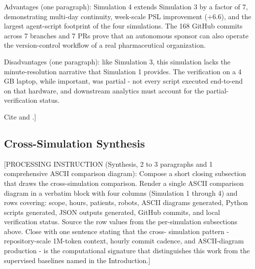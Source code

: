 Advantages (one paragraph): Simulation 4 extends Simulation 3 by a
factor of 7, demonstrating multi-day continuity, week-scale PSL
improvement (+6.6), and the largest agent-script footprint of the four
simulations. The 168 GitHub commits across 7 branches and 7 PRs prove
that an autonomous sponsor can also operate the version-control workflow
of a real pharmaceutical organization.

Disadvantages (one paragraph): like Simulation 3, this simulation lacks
the minute-resolution narrative that Simulation 1 provides. The
verification on a 4 GB laptop, while important, was partial - not every
script executed end-to-end on that hardware, and downstream analytics
must account for the partial-verification status.

Cite \cite{kawchak_2026_19396256} and \cite{fda2026realtime}.]

\subsection{Cross-Simulation Synthesis}
\label{sec:results-synthesis}

[PROCESSING INSTRUCTION (Synthesis, 2 to 3 paragraphs and 1 comprehensive
ASCII comparison diagram): Compose a short closing subsection that draws
the cross-simulation comparison. Render a single ASCII comparison diagram
in a verbatim block with four columns (Simulation 1 through 4) and rows
covering: scope, hours, patients, robots, ASCII diagrams generated,
Python scripts generated, JSON outputs generated, GitHub commits, and
local verification status. Source the row values from the per-simulation
subsections above. Close with one sentence stating that the cross-
simulation pattern - repository-scale 1M-token context, hourly commit
cadence, and ASCII-diagram production - is the computational signature
that distinguishes this work from the supervised baselines named in the
Introduction.]
